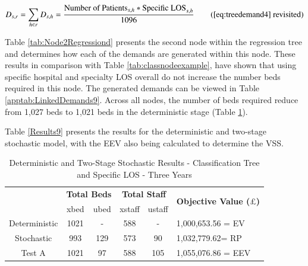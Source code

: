 \documentclass[../thesis.tex]{subfiles}
\begin{document}
\begin{equation}
        D_{s,r} = \sum\limits_{h \in r} D_{s,h} = \frac{\text{Number of Patients}_{s,h}*{\text{Specific LOS}_{s,h}}}{1096} \tag{\ref{eq:treedemand4} revisited}
\end{equation}

Table \ref{tab:Node2Regressiond} presents the second node within the regression tree and determines how each of the demands are generated within this node. These results in comparison with Table \ref{tab:classnodeexample}, have shown that using specific hospital and specialty LOS overall do not increase the number beds required in this node. The generated demands can be viewed in Table \ref{apptab:LinkedDemands9}. Across all nodes, the number of beds required reduce from 1,027 beds to  1,021 beds in the deterministic stage (Table \ref{tab:Results9}). 

\begin{table}[h!]
    \centering{}
    \caption{Classification Tree Node 2 - Specific LOS}
    \label{tab:Node2Regressiond}
\end{table}

Table \ref{Results9} presents the results for the deterministic and two-stage stochastic model, with the EEV also being calculated to determine the VSS.

\begin{table}[h!]
    \centering
    \begin{tabular}{cccccl}\toprule
 & \multicolumn{2}{l}{\textbf{Total Beds}} & \multicolumn{2}{c}{\textbf{Total Staff}} & \multirow{2}{*}{\textbf{Objective Value ($\pounds$)}}\\ \cmidrule(lr){2-3} \cmidrule(lr){4-5}
 & xbed           & ubed          & xstaff         & ustaff         \\ \midrule
    Deterministic      & 1021 & - & 588 & - & 1,000,653.56 = EV \\ \midrule
    Stochastic &993& 129& 573 & 90& 1,032,779.62= RP \\ \midrule
    Test A & 1021 & 97 & 588 & 105 & 1,055,076.86 = EEV \\\bottomrule
    \end{tabular}
    \caption{Deterministic and Two-Stage Stochastic Results - Classification Tree and Specific LOS - Three Years}
    \label{tab:Results9}
\end{table}
\end{document}
